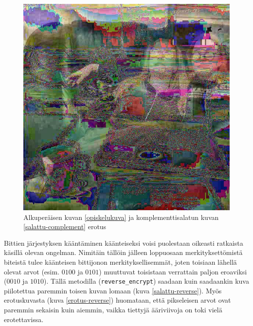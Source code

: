 \documentclass[a4paper,11pt]{article}
\begin{document}
\begin{figure}
    \centering
    \includegraphics[width= 120mm]{kuvat/erotus2.jpg}
    \caption{Alkuperäisen kuvan \ref{opiskelukuva} ja komplementtisalatun kuvan \ref{salattu-complement} erotus}
    \label{erotus-complement}
\end{figure}

Bittien järjestyksen kääntäminen käänteiseksi voisi puolestaan oikeasti ratkaista käsillä olevan ongelman. Nimitäin tällöin jälleen loppuosaan merkityksettömistä biteistä tulee käänteisen bittijonon merkityksellisemmät, joten toisiaan lähellä olevat arvot (esim. $0100$ ja $0101$) muuttuvat toisistaan verrattain paljon eroaviksi ($0010$ ja $1010$). Tällä metodilla (\texttt{reverse\_encrypt}) saadaan kuin saadaankin kuva piilotettua paremmin toisen kuvan lomaan (kuva \ref{salattu-reverse}). Myös erotuskuvasta (kuva \ref{erotus-reverse}) huomataan, että pikseleisen arvot ovat paremmin sekaisin kuin aiemmin, vaikka tiettyjä ääriviivoja on toki vielä erotettavissa.
\end{document}
